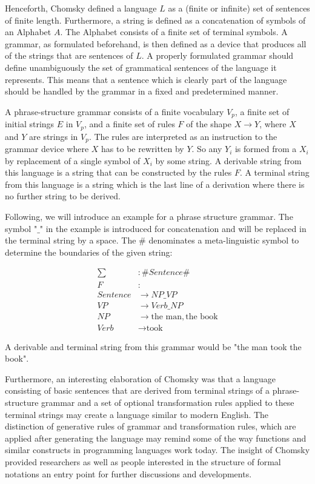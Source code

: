 \documentclass{article}
\begin{document}
Henceforth, Chomsky defined a language $L$ as a (finite or infinite) set of sentences of finite length. Furthermore, a string is defined as a concatenation of symbols of an Alphabet $A$. The Alphabet consists of a finite set of terminal symbols. A grammar, as formulated beforehand, is then defined as a device that produces all of the strings that are sentences of $L$. A properly formulated grammar should define unambiguously the set of grammatical sentences of the language it represents. This means that a sentence which is clearly part of the language should be handled by the grammar in a fixed and predetermined manner.

A phrase-structure grammar consists of a finite vocabulary $V_p$, a finite set of initial strings $E$ in $V_p$, and a finite set of rules $F$ of the shape $X \to Y$, where $X$ and $Y$ are strings in $V_p$. The rules are interpreted as an instruction to the grammar device where $X$ has to be rewritten by $Y$. So any $Y_i$ is formed from a $X_i$ by replacement of a single symbol of $X_i$ by some string. A derivable string from this language is a string that can be constructed by the rules $F$. A terminal string from this language is a string which is the last line of a derivation where there is no further string to be derived.

Following, we will introduce an example for a phrase structure grammar. The symbol "$\_$" in the example is introduced for concatenation and will be replaced in the terminal string by a space. The \# denominates a meta-linguistic symbol to determine the boundaries of the given string:

\begin{equation} \label{eq1}
	\begin{split}
		\sum &: \# Sentence \# \\
		F&: \\ Sentence &\to NP\_VP \\
		VP &\to Verb\_NP \\
		NP &\to \text{the man}, \text{the book} \\
		Verb &\to \text{took}
	\end{split}
\end{equation}

A derivable and terminal string from this grammar would be "the man took the book".

Furthermore, an interesting elaboration of Chomsky was that a language consisting of basic sentences that are derived from terminal strings of a phrase-structure grammar and a set of optional transformation rules applied to these terminal strings may create a language similar to modern English. The distinction of generative rules of grammar and transformation rules, which are applied after generating the language may remind some of the way functions and similar constructs in programming languages work today. The insight of Chomsky provided researchers as well as people interested in the structure of formal notations an entry point for further discussions and developments.
\end{document}
